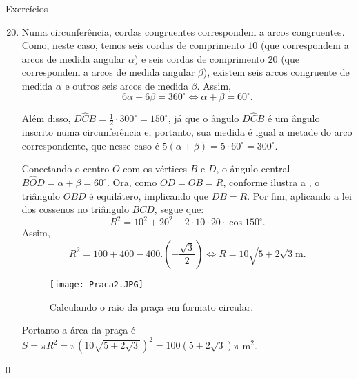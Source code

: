 \begin{answer}{Exercícios}
{\exerciselist
\begin{enumerate}\setcounter{enumi}{19}
\item Numa circunferência, cordas congruentes correspondem a arcos congruentes. Como, neste caso, temos seis cordas de comprimento $10$ (que correspondem a arcos de medida angular $\alpha$) e seis cordas de comprimento $20$ (que correspondem a arcos de medida angular $\beta$), existem seis arcos congruente de medida $\alpha$ e outros seis arcos de medida $\beta$. Assim,
    $$6\alpha+6\beta=360^\circ \iff \alpha+\beta=60^\circ.$$
   
    Além disso, $D\hat{C}B=\frac{1}{2}\cdot 300^\circ=150^\circ$, já que o ângulo $D\hat{C}B$ é um ângulo inscrito numa circunferência e, portanto, sua medida é igual a metade do arco correspondente, que nesse caso é $5(\alpha+\beta)=5\cdot60^\circ=300^\circ$.
    
    Conectando o centro $O$ com os vértices $B$ e $D$, o ângulo central $B\hat{O}D=\alpha+\beta=60^\circ$. Ora, como $OD=OB=R$, conforme ilustra a , o triângulo $OBD$ é equilátero, implicando que $DB=R$. Por fim, aplicando a lei dos cossenos no triângulo $BCD$, segue que:
    $$R^2=10^2+20^2-2\cdot10\cdot20\cdot\cos150^\circ.$$
    Assim, 
    $$R^2=100+400-400.\left(-\frac{\sqrt{3}}{2}\right) \iff R=10\sqrt{5+2\sqrt{3}} \text{m}.$$
     \begin{figure}[H]
    \centering
    \texttt{[image: Praca2.JPG]}
    \caption{Calculando o raio da praça em formato circular.}
    \label{praca2}
    \end{figure}
    
    Portanto a área da praça é $S=\pi R^2=\pi (10\sqrt{5+2\sqrt{3}})^2=100(5+2\sqrt{3})\pi$ m$^2$.
\end{enumerate}
}{0}
\end{answer}


